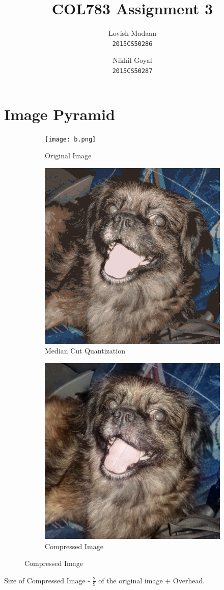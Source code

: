 \documentclass{article}
\title{COL783 Assignment 3}
\author{Lovish Madaan \\ \texttt{2015CS50286} \and Nikhil Goyal \\ \texttt{2015CS50287}}
\begin{document}
\maketitle
\section{Image Pyramid}
\begin{figure}[!ht]
\begin{subfigure}{.33\textwidth}
\centering
\texttt{[image: b.png]}
\caption{Original Image}
\end{subfigure}
\begin{subfigure}{.33\textwidth}
\centering
\includegraphics[width=.75\linewidth]{bquantized.png}
\caption{Median Cut Quantization}
\end{subfigure}
\begin{subfigure}{.33\textwidth}
\centering
\includegraphics[width=.75\linewidth]{bcompressed.png}
\caption{Compressed Image}
\end{subfigure}
\end{figure}
Size of Compressed Image - $\frac{2}{9}$ of the original image $+$ Overhead.
\end{document}
